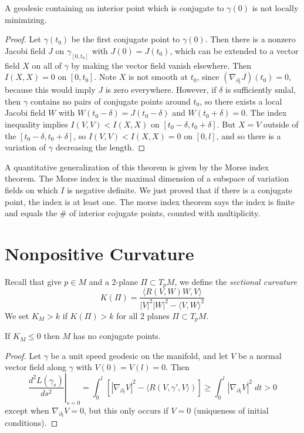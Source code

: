 \begin{corollary}
    A geodesic containing an interior point which is conjugate to $\gamma(0)$ is not locally minimizing.
\end{corollary}
\begin{proof}
    Let $\gamma(t_0)$ be the first conjugate point to $\gamma(0)$. Then there is a nonzero Jacobi field $J$ on $\gamma_{[0,t_0]}$ with $J(0) = J(t_0)$, which can be extended to a vector field $X$ on all of $\gamma$ by making the vector field vanish elsewhere. Then $I(X,X) = 0$ on $[0,t_0]$. Note $X$ is not smooth at $t_0$, since $(\nabla_{\partial_t} J)(t_0) = 0$, because this would imply $J$ is zero everywhere. However, if $\delta$ is sufficiently smlal, then $\gamma$ contains no pairs of conjugate points around $t_0$, so there exists a local Jacobi field $W$ with $W(t_0 - \delta) = J(t_0 - \delta)$ and $W(t_0 + \delta) = 0$. The index inequality implies $I(V,V) < I(X,X)$ on $[t_0 - \delta, t_0 + \delta]$. But $X = V$ outside of the $[t_0 - \delta, t_0 + \delta]$, so $I(V,V) < I(X,X) = 0$ on $[0,l]$, and so there is a variation of $\gamma$ decreasing the length.
\end{proof}

\begin{remark}
    A quantitative generalization of this theorem is given by the Morse index theorem. The Morse index  is the maximal dimension of a subspace of variation fields on which $I$ is negative definite. We just proved that if there is a conjugate point, the index is at least one. The morse index theorem says the index is finite and equals the \# of interior cojugate points, counted with multiplicity.
\end{remark}

\section{Nonpositive Curvature}

Recall that give $p \in M$ and a 2-plane $\Pi \subset T_p M$, we define the {\it sectional curvature}
%
\[ K(\Pi) = \frac{\langle R(V,W)W, V \rangle}{|V|^2|W|^2 - \langle V ,W \rangle^2} \]
%
We set $K_M > k$ if $K(\Pi) > k$ for all 2 planes $\Pi \subset T_p M$.

\begin{theorem}
    If $K_M \leq 0$ then $M$ has no conjugate points.
\end{theorem}
\begin{proof}
    Let $\gamma$ be a unit speed geodesic on the manifold, and let $V$ be a normal vector field along $\gamma$ with $V(0) = V(l) = 0$. Then
    \[ \left. \frac{d^2 L(\gamma_s)}{ds^2} \right|_{s = 0} = \int_0^l \left[ |\nabla_{\partial_t} V|^2 - \langle R(V,\gamma', V \rangle) \right] \geq \int_0^l \left| \nabla_{\partial_t} V \right|^2\; dt > 0 \]
    except when $\nabla_{\partial_t} V = 0$, but this only occurs if $V = 0$ (uniqueness of initial conditions).
\end{proof}

